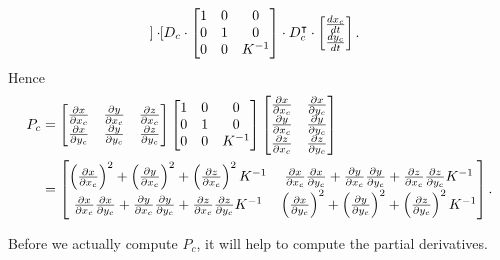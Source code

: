 \documentclass{ximera}
\begin{document}
\begin{problem}
\begin{freeResponse}
\begin{align*}
\begin{bmatrix}
    \end{bmatrix}\cdot D_{c}\cdot
    \begin{bmatrix}
      1 & 0 & 0\\
      0 & 1 & 0\\
    0 & 0 & K^{-1}
    \end{bmatrix}
    \cdot
    D_{c}^\transpose
    \cdot \begin{bmatrix}
      \frac{dx_c}{dt} \\ \frac{dy_c}{dt}
    \end{bmatrix}.
  \end{align*}
    Hence
    \begin{align*}
      P_c &=
      \begin{bmatrix}
        \pp[x]{x_c} & \pp[y]{x_c} & \pp[z]{x_c} \\
        \pp[x]{y_c} & \pp[y]{y_c} & \pp[z]{y_c}
      \end{bmatrix}
      \begin{bmatrix}
        1 & 0 & 0\\
        0 & 1 & 0\\
        0 & 0 & K^{-1}
      \end{bmatrix}
      \begin{bmatrix}
        \pp[x]{x_c} & \pp[x]{y_c}\\ 
        \pp[y]{x_c} & \pp[y]{y_c}\\
        \pp[z]{x_c} & \pp[z]{y_c}
      \end{bmatrix}\\
      &=
      \begin{bmatrix}
        \left(\pp[x]{x_c}\right)^2 + \left(\pp[y]{x_c}\right)^2 + \left(\pp[z]{x_c}\right)^2K^{-1} & \pp[x]{x_c}\pp[x]{y_c} + \pp[y]{x_c}\pp[y]{y_c} + \pp[z]{x_c}\pp[z]{y_c} K^{-1}\\
        \pp[x]{x_c}\pp[x]{y_c} + \pp[y]{x_c}\pp[y]{y_c} + \pp[z]{x_c}\pp[z]{y_c} K^{-1}       & \left(\pp[x]{y_c}\right)^2 + \left(\pp[y]{y_c}\right)^2 + \left(\pp[z]{y_c}\right)^2K^{-1}
      \end{bmatrix}.
    \end{align*}
  \end{freeResponse}
\end{problem}

Before we actually compute $P_c$, it will help to compute the partial
derivatives.
\end{document}
